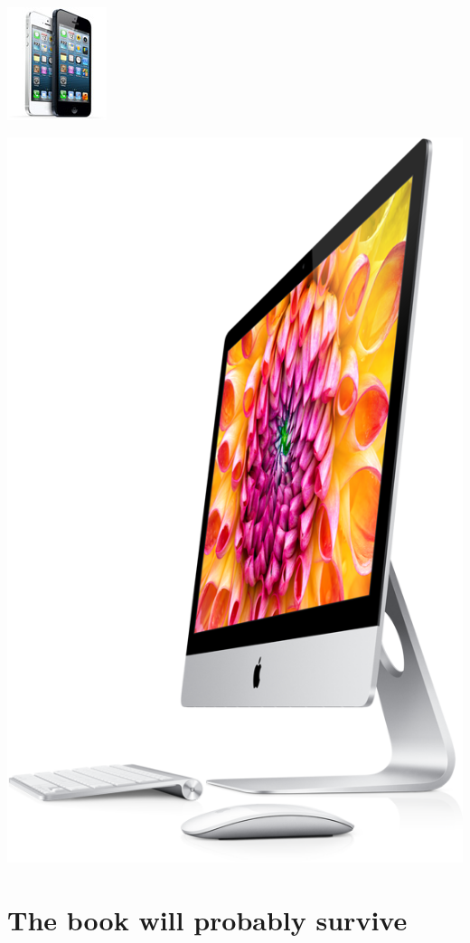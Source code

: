 \documentclass[%
twoside,                 %
final,                   %
chapterprefix=true,      %
open=right               %
10pt]{book}
\begin{document}
\begin{center}  %
  \centerline{\includegraphics[width=0.3\linewidth]{fig/iphones.jpg}}
\end{center}





\begin{center}  %
  \centerline{\includegraphics[width=0.7\linewidth]{fig/imac.png}}
\end{center}


\section*{The book will probably survive}
\end{document}
